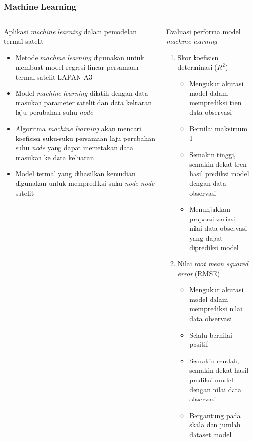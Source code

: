 \documentclass[8pt]{beamer}
\begin{document}
\begin{frame}
  \frametitle{Machine Learning}
  \begin{columns}[T]
    \begin{block}{\center Aplikasi \textit{machine learning} dalam pemodelan termal satelit}
      \begin{itemize}
        \item Metode \textit{machine learning} digunakan untuk membuat model regresi linear persamaan termal satelit LAPAN-A3
        \item Model \textit{machine learning} dilatih dengan data masukan parameter satelit dan data keluaran laju perubahan suhu \textit{node}
        \item Algoritma \textit{machine learning} akan mencari koefisien suku-suku persamaan laju perubahan suhu \textit{node} yang dapat memetakan data masukan ke data keluaran
        \item Model termal yang dihasilkan kemudian digunakan untuk memprediksi suhu \textit{node-node} satelit
      \end{itemize}
    \end{block}
    \begin{block}{\center Evaluasi performa model \\ \textit{machine learning}}
      \begin{enumerate}
        \item Skor koefisien determinasi ($R^2$) \cite{gupta2021}
          \begin{itemize}
            \item Mengukur akurasi model dalam memprediksi tren data observasi
            \item Bernilai maksimum 1
            \item Semakin tinggi, semakin dekat tren hasil prediksi model dengan data observasi
            \item Menunjukkan proporsi variasi nilai data observasi yang dapat diprediksi model
          \end{itemize}
        \item Nilai \textit{root mean squared error} (RMSE) \cite{zheng}
          \begin{itemize}
            \item Mengukur akurasi model dalam memprediksi nilai data observasi
            \item Selalu bernilai positif
            \item Semakin rendah, semakin dekat hasil prediksi model dengan nilai data observasi
            \item Bergantung pada skala dan jumlah dataset model
          \end{itemize}
        \end{enumerate}
    \end{block}
  \end{columns}
\end{frame}
\end{document}
